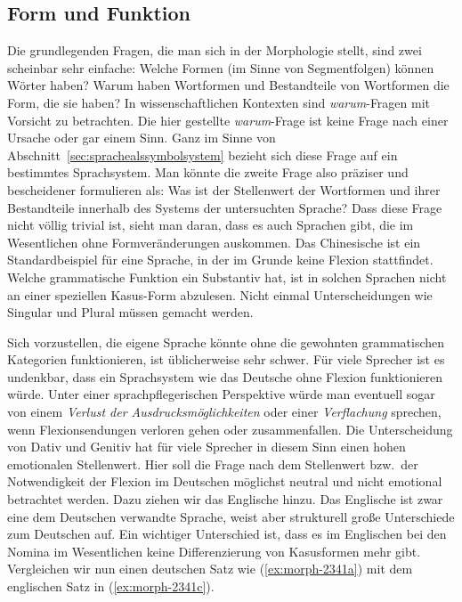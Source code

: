 \subsection{Form und Funktion}

\label{sec:morphgrundl}

Die grundlegenden Fragen, die man sich in der Morphologie stellt, sind zwei scheinbar sehr einfache:
Welche Formen (im Sinne von Segmentfolgen) können Wörter haben?
Warum haben Wortformen und Bestandteile von Wortformen die Form, die sie haben?
In wissenschaftlichen Kontexten sind \textit{warum}-Fragen mit Vorsicht zu betrachten.
Die hier gestellte \textit{warum}-Frage ist keine Frage nach einer Ursache oder gar einem Sinn.
Ganz im Sinne von Abschnitt~\ref{sec:sprachealssymbolsystem} bezieht sich diese Frage auf ein bestimmtes Sprachsystem.
Man könnte die zweite Frage also präziser und bescheidener formulieren als:
Was ist der Stellenwert der Wortformen und ihrer Bestandteile innerhalb des Systems der untersuchten Sprache?
Dass diese Frage nicht völlig trivial ist, sieht man daran, dass es auch Sprachen gibt, die im Wesentlichen ohne Formveränderungen auskommen.
Das Chinesische ist ein Standardbeispiel für eine Sprache, in der im Grunde keine Flexion stattfindet.
Welche grammatische Funktion \zB ein Substantiv hat, ist in solchen Sprachen nicht an einer speziellen Kasus-Form abzulesen.
Nicht einmal Unterscheidungen wie Singular und Plural müssen gemacht werden.

Sich vorzustellen, die eigene Sprache könnte ohne die gewohnten grammatischen Kategorien funktionieren, ist üblicherweise sehr schwer.
Für viele Sprecher ist es \zB undenkbar, dass ein Sprachsystem wie das Deutsche ohne Flexion funktionieren würde.
Unter einer sprachpflegerischen Perspektive würde man eventuell sogar von einem \textit{Verlust der Ausdrucksmöglichkeiten} oder einer \textit{Verflachung} sprechen, wenn Flexionsendungen verloren gehen oder zusammenfallen.
Die Unterscheidung von Dativ und Genitiv hat für viele Sprecher in diesem Sinn einen hohen emotionalen Stellenwert. 
Hier soll die Frage nach dem Stellenwert bzw.\ der Notwendigkeit der Flexion im Deutschen möglichst neutral und nicht emotional betrachtet werden.
Dazu ziehen wir das Englische hinzu.
Das Englische ist zwar eine dem Deutschen verwandte Sprache, weist aber strukturell große Unterschiede zum Deutschen auf.
Ein wichtiger Unterschied ist, dass es im Englischen bei den Nomina im Wesentlichen keine Differenzierung von Kasusformen mehr gibt.
Vergleichen wir nun einen deutschen Satz wie (\ref{ex:morph-2341a}) mit dem englischen Satz in (\ref{ex:morph-2341c}).


